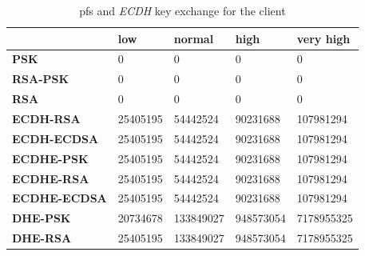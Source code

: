 \documentclass{llncs}
\begin{document}
\begin{table}[]
\begin{tabular}{|l|l|l|l|l|}
\hline
                                           & \textbf{low}                    & \textbf{normal}                 & \textbf{high}                   & \textbf{very high}               \\ \hline
\textbf{PSK}                               & 0                               & 0                               & 0                               & 0                                \\ \hline
\textbf{RSA-PSK}                           & 0                               & 0                               & 0                               & 0                                \\ \hline
\textbf{RSA}                               & 0                               & 0                               & 0                               & 0                                \\ \hline
\rowcolor[HTML]{9B9B9B}
{\color[HTML]{333333} \textbf{ECDH-RSA}}   & {\color[HTML]{333333} 25405195} & {\color[HTML]{333333} 54442524} & {\color[HTML]{333333} 90231688} & {\color[HTML]{333333} 107981294} \\ \hline
\rowcolor[HTML]{9B9B9B}
{\color[HTML]{333333} \textbf{ECDH-ECDSA}} & {\color[HTML]{333333} 25405195} & {\color[HTML]{333333} 54442524} & {\color[HTML]{333333} 90231688} & {\color[HTML]{333333} 107981294} \\ \hline
\textbf{ECDHE-PSK}                         & 25405195                        & 54442524                        & 90231688                        & 107981294                        \\ \hline
\textbf{ECDHE-RSA}                         & 25405195                        & 54442524                        & 90231688                        & 107981294                        \\ \hline
\textbf{ECDHE-ECDSA}                       & 25405195                        & 54442524                        & 90231688                        & 107981294                        \\ \hline
\textbf{DHE-PSK}                           & 20734678                        & 133849027                       & 948573054                        & 7178955325                        \\ \hline
\textbf{DHE-RSA}                           & 25405195                        & 133849027                        & 948573054                        & 7178955325                        \\ \hline
\end{tabular}
\centering \caption{\label{table:pfs-cost-client} \gls{pfs} and \textit{ECDH} key exchange for the client}
\end{table}
\end{document}
